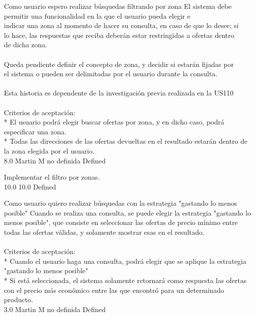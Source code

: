\vspace{20pt}

	{Como usuario espero realizar búsquedas filtrando por zona} %
	{El sistema debe permitir una funcionalidad en la que el usuario pueda elegir e\\
indicar una zona al momento de hacer su consulta, en caso de que lo desee; si\\
lo hace, las respuestas que reciba deberán estar restringidas a ofertas dentro\\
de dicha zona.\\
  \\
Queda pendiente definir el concepto de zona, y decidir si estarán fijadas por\\
el sistema o pueden ser delimitadas por el usuario durante la consulta.\\
  \\
Esta historia es dependente de la investigación previa realizada en la US110\\
  \\
Criterios de aceptación:\\
* El usuario podrá elegir buscar ofertas por zona, y en dicho caso, podrá especificar una zona.  \\
* Todas las direcciones de las ofertas devueltas en el resultado estarán dentro de la zona elegida por el usuario.\\
} %
	{} %
	{8.0} %
	{Martin M} %
	{no definida} %
	{Defined} %

		{Implementar el filtro por zonas.} %
		{\\
} %
		{10.0} %
		{} %
		{10.0} %
		{Defined} %


\vspace{20pt}

	{Como usuario quiero realizar búsquedas con la estrategia "gastando lo menos posible"} %
	{Cuando se realiza una consulta, se puede elegir la estrategia "gastando lo\\
menos posible", que consiste en seleccionar las ofertas de precio mínimo entre\\
todas las ofertas válidas, y solamente mostrar esas en el resultado.\\
  \\
Criterios de aceptación:\\
* Cuando el usuario haga una consulta, podrá elegir que se aplique la estrategia "gastando lo menos posible"  \\
* Si está seleccionada, el sistema solamente retornará como respuesta las ofertas con el precio más económico entre las que encontró para un determinado producto.\\
} %
	{} %
	{3.0} %
	{Martin M} %
	{no definida} %
	{Defined} %


